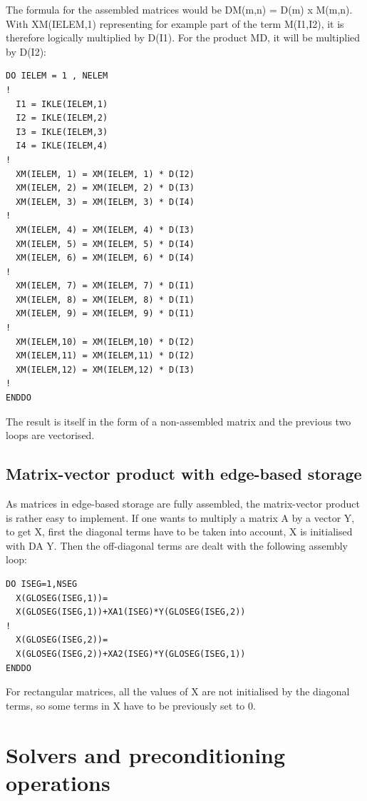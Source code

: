 The formula for the assembled matrices would be DM(m,n) = D(m) x M(m,n). With
XM(IELEM,1) representing for example part of the term M(I1,I2), it is therefore
logically multiplied by D(I1). For the product MD, it will be multiplied by
D(I2):


\begin{lstlisting}[language=TelFortran]
DO IELEM = 1 , NELEM
!
  I1 = IKLE(IELEM,1)
  I2 = IKLE(IELEM,2)
  I3 = IKLE(IELEM,3)
  I4 = IKLE(IELEM,4)
!
  XM(IELEM, 1) = XM(IELEM, 1) * D(I2)
  XM(IELEM, 2) = XM(IELEM, 2) * D(I3)
  XM(IELEM, 3) = XM(IELEM, 3) * D(I4)
!
  XM(IELEM, 4) = XM(IELEM, 4) * D(I3)
  XM(IELEM, 5) = XM(IELEM, 5) * D(I4)
  XM(IELEM, 6) = XM(IELEM, 6) * D(I4)
!
  XM(IELEM, 7) = XM(IELEM, 7) * D(I1)
  XM(IELEM, 8) = XM(IELEM, 8) * D(I1)
  XM(IELEM, 9) = XM(IELEM, 9) * D(I1)
!
  XM(IELEM,10) = XM(IELEM,10) * D(I2)
  XM(IELEM,11) = XM(IELEM,11) * D(I2)
  XM(IELEM,12) = XM(IELEM,12) * D(I3)
!
ENDDO
\end{lstlisting}

The result is itself in the form of a non-assembled matrix and the previous two
loops are vectorised.

\subsection{Matrix-vector product with edge-based storage}

As matrices in edge-based storage are fully assembled, the matrix-vector
product is rather easy to implement. If one wants to multiply a matrix A by a
vector Y, to get X, first the diagonal terms have to be taken into account, X
is initialised with DA Y. Then the off-diagonal terms are dealt with the
following assembly loop:

\begin{lstlisting}[language=TelFortran]
DO ISEG=1,NSEG
  X(GLOSEG(ISEG,1))=
  X(GLOSEG(ISEG,1))+XA1(ISEG)*Y(GLOSEG(ISEG,2))
!
  X(GLOSEG(ISEG,2))=
  X(GLOSEG(ISEG,2))+XA2(ISEG)*Y(GLOSEG(ISEG,1))
ENDDO
\end{lstlisting}

For rectangular matrices, all the values of X are not initialised by the
diagonal terms, so some terms in X have to be previously set to 0.

\section{Solvers and preconditioning operations}

